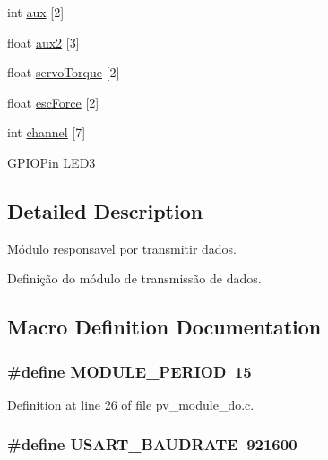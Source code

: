 \begin{DoxyCompactItemize}
int \hyperlink{group__app__do_ga5acd447dc75f4ac13cdac246a2c75291}{aux} \mbox{[}2\mbox{]}
\item 
float \hyperlink{group__app__do_gae93eafaee31c92a65f90bcb26eda96df}{aux2} \mbox{[}3\mbox{]}
\item 
float \hyperlink{group__app__do_gaa56fed06b51b312e13aa20c0c740795e}{servo\+Torque} \mbox{[}2\mbox{]}
\item 
float \hyperlink{group__app__do_ga7b919fc59fbb86e34627c65320446dd3}{esc\+Force} \mbox{[}2\mbox{]}
\item 
int \hyperlink{group__app__do_ga7738565d91833be3229136a1beaaf44b}{channel} \mbox{[}7\mbox{]}
\item 
G\+P\+I\+O\+Pin \hyperlink{group__app__do_ga804d3aba22a782022afc3977966f2faa}{L\+E\+D3}
\end{DoxyCompactItemize}


\subsection{Detailed Description}
Módulo responsavel por transmitir dados. 

Definição do módulo de transmissão de dados. 

\subsection{Macro Definition Documentation}
\subsubsection[{\texorpdfstring{M\+O\+D\+U\+L\+E\+\_\+\+P\+E\+R\+I\+OD}{MODULE_PERIOD}}]{\setlength{\rightskip}{0pt plus 5cm}\#define M\+O\+D\+U\+L\+E\+\_\+\+P\+E\+R\+I\+OD~15}\hypertarget{group__app__do_ga0ac6c9f2991b096e49c354e5cce6fae0}{}\label{group__app__do_ga0ac6c9f2991b096e49c354e5cce6fae0}


Definition at line 26 of file pv\+\_\+module\+\_\+do.\+c.

\subsubsection[{\texorpdfstring{U\+S\+A\+R\+T\+\_\+\+B\+A\+U\+D\+R\+A\+TE}{USART_BAUDRATE}}]{\setlength{\rightskip}{0pt plus 5cm}\#define U\+S\+A\+R\+T\+\_\+\+B\+A\+U\+D\+R\+A\+TE~921600}\hypertarget{group__app__do_ga6a53a6c94a70cc286e300a0ea8f46ba4}{}\label{group__app__do_ga6a53a6c94a70cc286e300a0ea8f46ba4}


